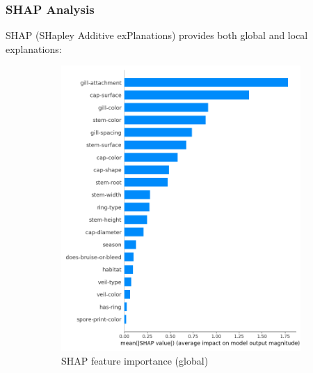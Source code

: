 \documentclass[11pt,a4paper]{article}
\begin{document}
\subsubsection{SHAP Analysis}
SHAP (SHapley Additive exPlanations) provides both global and local explanations:

\begin{figure}[H]
    \centering
    \begin{subfigure}{0.48\textwidth}
        \includegraphics[width=\textwidth]{figures/shap_bar.png}
        \caption{SHAP feature importance (global)}
    \end{subfigure}
    \hfill
    \begin{subfigure}{0.48\textwidth}

\end{subfigure}
\end{figure}
\end{document}
